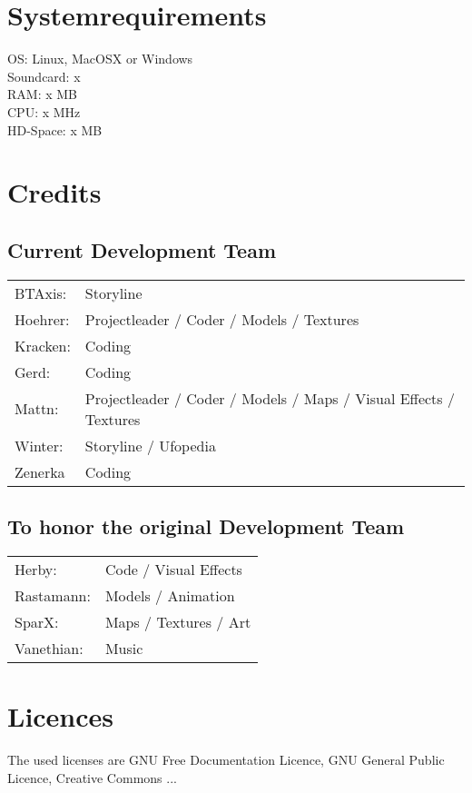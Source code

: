 \section{Systemrequirements}
OS: Linux, MacOSX or Windows\\
Soundcard: x\\
RAM: x MB\\
CPU: x MHz\\
HD-Space: x MB\\

\newpage

\section{Credits}

\subsection{Current Development Team}
\begin{tabular}{ll}
BTAxis:  	&	Storyline \\
Hoehrer:  	&	Projectleader / Coder / Models / Textures \\
Kracken:	&	Coding \\
Gerd:		&	Coding \\
Mattn:  	&	Projectleader / Coder / Models / Maps / Visual Effects / Textures \\
Winter:		&	Storyline / Ufopedia \\
Zenerka		&	Coding
\end{tabular} 

\subsection{To honor the original Development Team}
\begin{tabular}{ll}
Herby:  	&	Code / Visual Effects\\ 
Rastamann:	&	Models / Animation\\ 
SparX:  	&	Maps / Textures / Art\\ 
Vanethian:  &	Music\\ 
\end{tabular} 

\newpage

\section{Licences}
The used licenses are GNU Free Documentation Licence, GNU General Public Licence, Creative Commons ...


